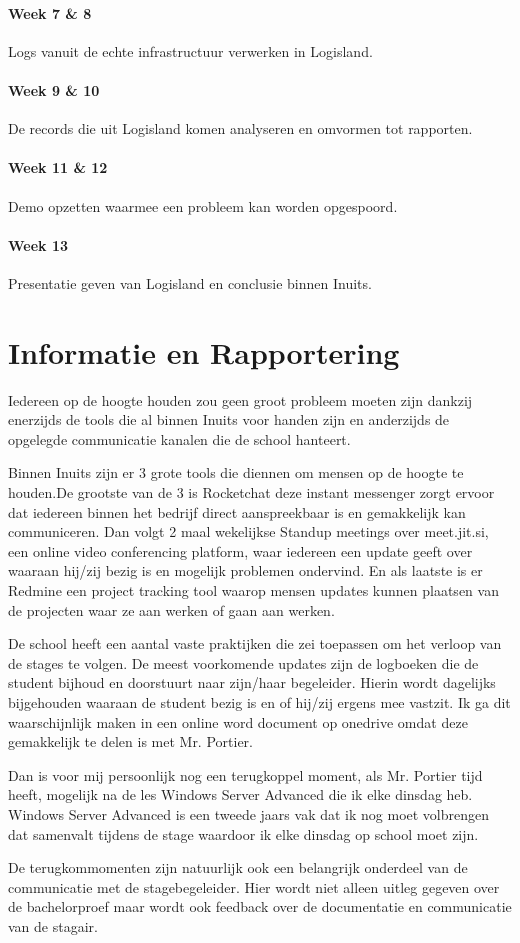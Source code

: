 \documentclass[a4paper]{article}
\begin{document}
\paragraph{Week 7 \& 8} Logs vanuit de echte infrastructuur verwerken in Logisland.
\paragraph{Week 9 \& 10} De records die uit Logisland komen analyseren en omvormen tot rapporten.
\paragraph{Week 11 \& 12} Demo opzetten waarmee een probleem kan worden opgespoord.
\paragraph{Week 13} Presentatie geven van Logisland en conclusie binnen Inuits.

\newpage{}
\section{Informatie en Rapportering}
Iedereen op de hoogte houden zou geen groot probleem moeten zijn dankzij enerzijds de tools die al binnen Inuits voor handen zijn en anderzijds de opgelegde communicatie kanalen die de school hanteert.
\par
Binnen Inuits zijn er 3 grote tools die diennen om mensen op de hoogte te houden.De grootste van de 3 is Rocketchat deze instant messenger zorgt ervoor dat iedereen binnen het bedrijf direct aanspreekbaar is en gemakkelijk kan communiceren.
Dan volgt 2 maal wekelijkse Standup meetings over meet.jit.si, een online video conferencing platform, waar iedereen een update geeft over waaraan hij/zij bezig is en mogelijk problemen ondervind.
En als laatste is er Redmine een project tracking tool waarop mensen updates kunnen plaatsen van de projecten waar ze aan werken of gaan aan werken.
\par
De school heeft een aantal vaste praktijken die zei toepassen om het verloop van de stages te volgen.
De meest voorkomende updates zijn de logboeken die de student bijhoud en doorstuurt naar zijn/haar begeleider.
Hierin wordt dagelijks bijgehouden waaraan de student bezig is en of hij/zij ergens mee vastzit. Ik ga dit waarschijnlijk maken in een online word document op onedrive omdat deze gemakkelijk te delen is met Mr. Portier.
\par
Dan is voor mij persoonlijk nog een terugkoppel moment, als Mr. Portier tijd heeft, mogelijk na de les Windows Server Advanced die ik elke dinsdag heb. 
Windows Server Advanced is een tweede jaars vak dat ik nog moet volbrengen dat samenvalt tijdens de stage waardoor ik elke dinsdag op school moet zijn.
\par
De terugkommomenten zijn natuurlijk ook een belangrijk onderdeel van de communicatie met de stagebegeleider. Hier wordt niet alleen uitleg gegeven over de bachelorproef maar wordt ook feedback over de documentatie en communicatie van de stagair.
\end{document}
